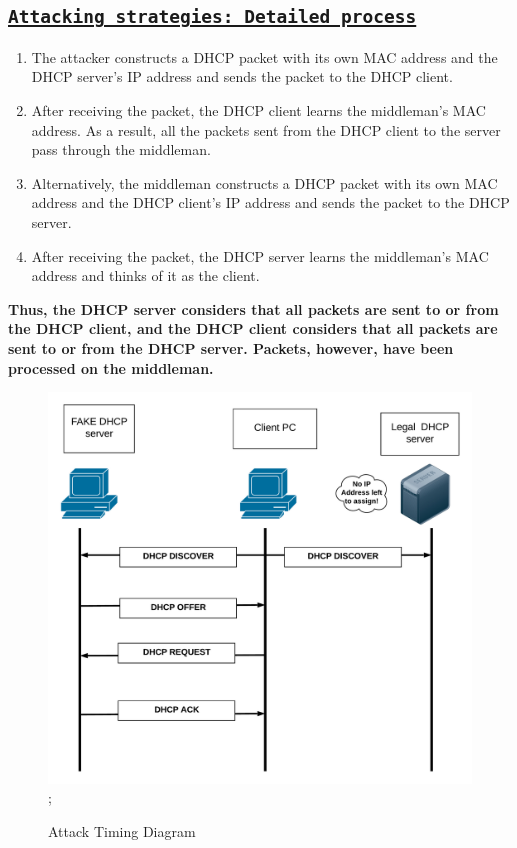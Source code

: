 \documentclass[12pt]{article}
\begin{document}
\begin{sloppypar}
\subsection{\texttt{\underline{Attacking strategies: Detailed process} }}


\begin{enumerate}
	\item The attacker constructs a DHCP packet with its own MAC address and the DHCP server's IP address and sends the packet to the DHCP client.
	
	\item After receiving the packet, the DHCP client learns the middleman's MAC address. As a result, all the packets sent from the DHCP client to the server pass through the middleman.
	
	\item Alternatively, the middleman constructs a DHCP packet with its own MAC address and the DHCP client's IP address and sends the packet to the DHCP server.
	
	\item After receiving the packet, the DHCP server learns the middleman's MAC address and thinks of it as the client. 
	
	
\end{enumerate}

\textbf{Thus, the DHCP server considers that all packets are sent to or from the DHCP client, and the DHCP client considers that all packets are sent to or from the DHCP server. Packets, however, have been processed on the middleman.}

\begin{figure}[h]
	\centering
	\includegraphics[width=15 cm,height=13 cm]{images/attack_timing.png};
	\caption{Attack Timing Diagram}
\end{figure}


\end{sloppypar}
\end{document}
